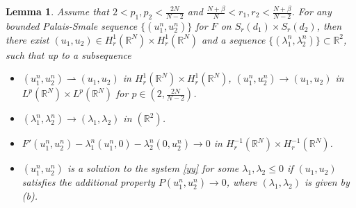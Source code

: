 \documentclass[10pt,a4paper]{amsart}
\numberwithin{equation}{section}
\newtheorem{lemma}[theo]{Lemma}
\begin{document}
\begin{lemma}\label{zyy4}
Assume that $2<p_1,p_2<\frac{2N}{N-2}$ and 
$\frac{N+\beta}{N}<r_1,r_2<\frac{N+\beta}{N-2}$. For any bounded Palais-Smale sequence
$\{(u_1^n,u_2^n)\}$ for $F$ on $S_r(d_1)\times S_r(d_2)$, then there exist 
$(u_1,u_2)\in H_r^1(\mathbb{R}^N)\times H_r^1(\mathbb{R}^N)$ and a sequence
$\{(\lambda_1^n,\lambda_2^n)\}\subset\mathbb{R}^2$, such that up to a subsequence
\begin{itemize}
\item[(a)] $(u_1^n,u_2^n)\rightharpoonup (u_1,u_2)$ in 
 $H_r^1(\mathbb{R}^N)\times H_r^1(\mathbb{R}^N)$, 
 $(u_1^n,u_2^n)\to  (u_1,u_2)$ in $L^p
(\mathbb{R}^N)\times L^p(\mathbb{R}^N)$ for $p\in(2,\frac{2N}{N-2})$.

\item[(b)] $(\lambda_1^n,\lambda_2^n) \to  (\lambda_1,\lambda_2)$ in
 $(\mathbb{R}^2)$.
 
\item[(c)] $F'(u_1^n,u_2^n)-\lambda_1^n(u_1^n,0)-\lambda_2^n(0,u_2^n)\to 0$
 in $H_r^{-1}(\mathbb{R}^N)\times H_r^{-1}(\mathbb{R}^N)$.
 
\item[(d)] $(u_1^n,u_2^n)$ is a solution to the system \eqref{yy} for some 
 $\lambda_1,\lambda_2\leq0$ if $(u_1,u_2)$ satisfies the additional property
$P(u_1^n,u_2^n)\to 0$, where $(\lambda_1,\lambda_2)$ is given by (b).
\end{itemize}
\end{lemma}
\end{document}

